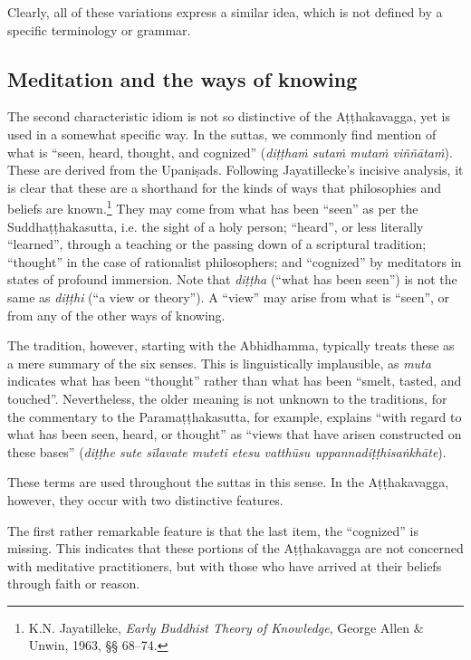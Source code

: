 \documentclass[12pt,openany]{book}%
\begin{document}
Clearly, all of these variations express a similar idea, which is not defined by a specific terminology or grammar.

\subsection*{Meditation and the ways of knowing}

The second characteristic idiom is not so distinctive of the \textsanskrit{Aṭṭhakavagga}, yet is used in a somewhat specific way. In the suttas, we commonly find mention of what is “seen, heard, thought, and cognized” (\textit{\textsanskrit{diṭṭhaṁ} \textsanskrit{sutaṁ} \textsanskrit{mutaṁ} \textsanskrit{viññātaṁ}}). These are derived from the \textsanskrit{Upaniṣads}. Following Jayatillecke’s incisive analysis, it is clear that these are a shorthand for the kinds of ways that philosophies and beliefs are known.\footnote{K.N. Jayatilleke, \textit{Early Buddhist Theory of Knowledge}, George Allen \& Unwin, 1963, §§ 68–74. } They may come from what has been “seen” as per the \textsanskrit{Suddhaṭṭhakasutta}, i.e. the sight of a holy person; “heard”, or less literally “learned”, through a teaching or the passing down of a scriptural tradition; “thought” in the case of rationalist philosophers; and “cognized” by meditators in states of profound immersion. Note that \textit{\textsanskrit{diṭṭha}} (“what has been seen”) is not the same as \textit{\textsanskrit{diṭṭhi}} (“a view or theory”). A “view” may arise from what is “seen”, or from any of the other ways of knowing.

The tradition, however, starting with the Abhidhamma, typically treats these as a mere summary of the six senses. This is linguistically implausible, as \textit{muta} indicates what has been “thought” rather than what has been “smelt, tasted, and touched”. Nevertheless, the older meaning is not unknown to the traditions, for the commentary to the \textsanskrit{Paramaṭṭhakasutta}, for example, explains “with regard to what has been seen, heard, or thought” as “views that have arisen constructed on these bases” (\textit{\textsanskrit{diṭṭhe} sute \textsanskrit{sīlavate} muteti etesu \textsanskrit{vatthūsu} \textsanskrit{uppannadiṭṭhisaṅkhāte}}).

These terms are used throughout the suttas in this sense. In the \textsanskrit{Aṭṭhakavagga}, however, they occur with two distinctive features.

The first rather remarkable feature is that the last item, the “cognized” is missing. This indicates that these portions of the \textsanskrit{Aṭṭhakavagga} are not concerned with meditative practitioners, but with those who have arrived at their beliefs through faith or reason.
\end{document}
